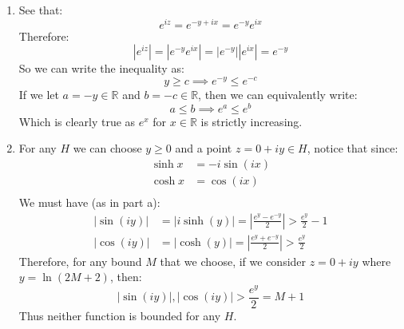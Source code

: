 \documentclass[a4paper, 11pt]{article}
\newcommand{\RR}{\mathbb{R}}
\begin{document}
\begin{multicols}{2}
\begin{enumerate}[label=(\alph*)]
		\item See that:
		      $$e^{iz} = e^{-y+ix} = e^{-y}e^{ix}$$
		      Therefore:
		      $$|e^{iz}|= |e^{-y}e^{ix}| = |e^{-y}| |e^{ix}| = e^{-y}$$
		      So we can write the inequality as:
		      $$y\geq c \implies e^{-y}\leq e^{-c}$$
		      If we let $a=-y\in\RR$ and $b=-c\in\RR$, then we can equivalently write:
		      $$a\leq b \implies e^{a}\leq e^{b}$$
		      Which is clearly true as $e^x$ for $x\in\RR$ is strictly increasing.

		\item For any $H$ we can choose $y\geq0$ and a point $z=0+iy\in H$, notice that since:
		      \begin{align*}
			      \sinh x & =-i\sin(ix) \\
			      \cosh x & = \cos(ix)  \\
		      \end{align*}
		      We must have (as in part a):
		      \begin{align*}
			      |\sin(iy)| & = |i\sinh(y) | = \left| \frac{e^y-e^{-y}}{2}\right| > \frac{e^y}2 -1 \\
			      |\cos(iy)| & = | \cosh(y) | = \left| \frac{e^y+e^{-y}}{2}\right| > \frac{e^y}2
		      \end{align*}
		      Therefore, for any bound $M$ that we choose, if we consider $z=0+iy$ where $y=\ln(2M+2)$, then:
		      $$ |\sin(iy)|, |\cos(iy)| > \frac{e^y}2 = M+1$$
		      Thus neither function is bounded for any $H$.




\end{enumerate}
\end{multicols}
\end{document}
